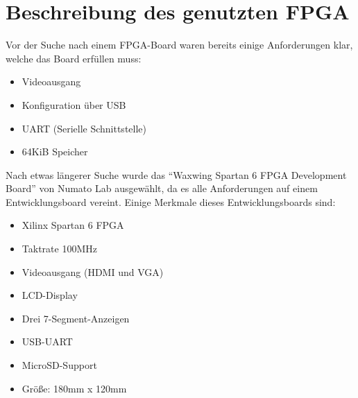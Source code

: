 \section{Beschreibung des genutzten FPGA}
Vor der Suche nach einem FPGA-Board waren bereits einige Anforderungen klar,
welche das Board erfüllen muss:
\begin{itemize}
	\item Videoausgang
	\item Konfiguration über USB
	\item \acs{UART} (Serielle Schnittstelle)
	\item 64KiB Speicher
\end{itemize}
Nach etwas längerer Suche wurde das "`Waxwing Spartan 6 FPGA Development Board"'
von Numato Lab ausgewählt, da es alle Anforderungen auf einem Entwicklungsboard
vereint. Einige Merkmale dieses Entwicklungsboards sind:
\begin{itemize}
	\item Xilinx Spartan 6 FPGA
	\item Taktrate 100MHz
	\item Videoausgang (HDMI und VGA)
	\item LCD-Display
	\item Drei 7-Segment-Anzeigen
	\item USB-UART
	\item MicroSD-Support
	\item Größe: 180mm x 120mm
\end{itemize}
